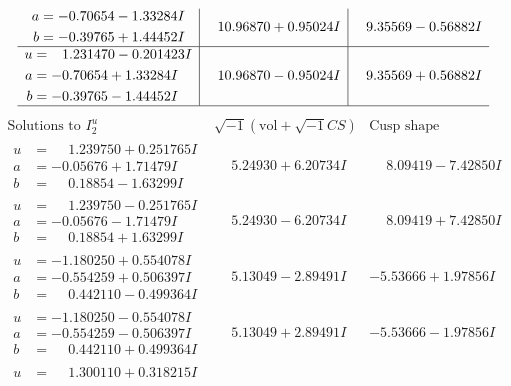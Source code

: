 \documentclass[1p]{elsarticle_modified}
\theoremstyle{definition}
\newcommand{\I}{\sqrt{-1}}
\begin{document}
$$\begin{array}{c|c|c}
\begin{aligned}
a &= -0.70654 - 1.33284 I \\
b &= -0.39765 + 1.44452 I\end{aligned}
 & \phantom{-}10.96870 + 0.95024 I & \phantom{-}9.35569 - 0.56882 I \\ \hline\begin{aligned}
u &= \phantom{-}1.231470 - 0.201423 I \\
a &= -0.70654 + 1.33284 I \\
b &= -0.39765 - 1.44452 I\end{aligned}
 & \phantom{-}10.96870 - 0.95024 I & \phantom{-}9.35569 + 0.56882 I\\
 \hline 
 \end{array}$$\newpage$$\begin{array}{c|c|c}  
\text{Solutions to }I^u_{2}& \I (\text{vol} + \sqrt{-1}CS) & \text{Cusp shape}\\
 \hline 
\begin{aligned}
u &= \phantom{-}1.239750 + 0.251765 I \\
a &= -0.05676 + 1.71479 I \\
b &= \phantom{-}0.18854 - 1.63299 I\end{aligned}
 & \phantom{-}5.24930 + 6.20734 I & \phantom{-}8.09419 - 7.42850 I \\ \hline\begin{aligned}
u &= \phantom{-}1.239750 - 0.251765 I \\
a &= -0.05676 - 1.71479 I \\
b &= \phantom{-}0.18854 + 1.63299 I\end{aligned}
 & \phantom{-}5.24930 - 6.20734 I & \phantom{-}8.09419 + 7.42850 I \\ \hline\begin{aligned}
u &= -1.180250 + 0.554078 I \\
a &= -0.554259 + 0.506397 I \\
b &= \phantom{-}0.442110 - 0.499364 I\end{aligned}
 & \phantom{-}5.13049 - 2.89491 I & -5.53666 + 1.97856 I \\ \hline\begin{aligned}
u &= -1.180250 - 0.554078 I \\
a &= -0.554259 - 0.506397 I \\
b &= \phantom{-}0.442110 + 0.499364 I\end{aligned}
 & \phantom{-}5.13049 + 2.89491 I & -5.53666 - 1.97856 I \\ \hline\begin{aligned}
u &= \phantom{-}1.300110 + 0.318215 I \\

\end{aligned}
\end{array}$$
\end{document}
